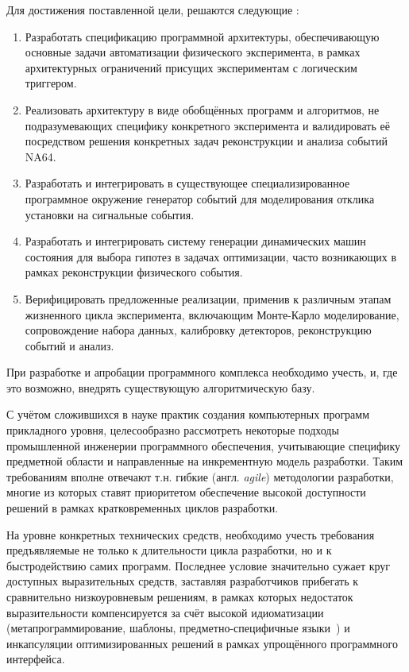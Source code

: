 Для достижения поставленной цели, решаются следующие {\tasks}:
\begin{enumerate}[beginpenalty=10000]
    \item Разработать спецификацию программной архитектуры,
    обеспечивающую основные задачи автоматизации физического эксперимента,
    в рамках архитектурных ограничений присущих экспериментам
    с логическим триггером.
    \item Реализовать архитектуру в виде
    обобщённых программ и алгоритмов, не подразумевающих специфику
    конкретного эксперимента и валидировать её посредством решения
    конкретных задач реконструкции и анализа событий NA64.
    \item Разработать и интегрировать в существующее специализированное
    программное окружение генератор событий для моделирования
    отклика установки на сигнальные события.
    \item Разработать и интегрировать систему генерации динамических
    машин состояния для выбора гипотез в задачах оптимизации, часто
    возникающих в рамках реконструкции физического события.
    \item Верифицировать предложенные реализации,
    применив к различным этапам жизненного цикла эксперимента,
    включающим Монте-Карло моделирование, сопровождение набора данных,
    калибровку детекторов, реконструкцию событий и анализ.
\end{enumerate}
При разработке и апробации программного комплекса необходимо
учесть, и, где это возможно, внедрять существующую алгоритмическую
базу.

{\methods}
С учётом сложившихся в науке практик создания компьютерных программ
прикладного уровня, целесообразно рассмотреть некоторые
подходы промышленной инженерии программного обеспечения,
учитывающие специфику предметной области и направленные
на инкрементную модель разработки. Таким требованиям вполне
отвечают т.н. гибкие (англ. \emph{agile})
методологии разработки, многие
из которых ставят приоритетом обеспечение высокой доступности
решений в рамках кратковременных циклов разработки.

На уровне конкретных технических средств, необходимо учесть
требования предъявляемые не только к длительности цикла разработки, но и
к быстродействию самих программ. Последнее условие значительно сужает
круг доступных выразительных средств, заставляя разработчиков
прибегать к сравнительно низкоуровневым решениям, в рамках которых
недостаток выразительности компенсируется за счёт высокой идиоматизации
(метапрограммирование, шаблоны, предметно-специфичные языки~\cite{perspectives-object-model-2012})
и инкапсуляции оптимизированных решений в рамках упрощённого
программного интерфейса.

